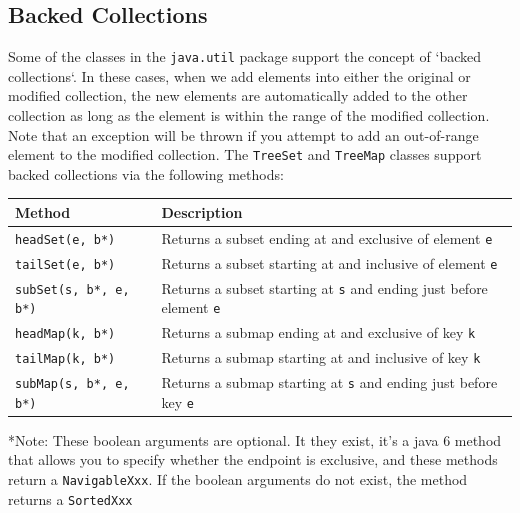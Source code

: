 \subsection{Backed Collections}
Some of the classes in the \verb#java.util# package support the concept of 
`backed collections`. In these cases, when we add elements into either the 
original or modified collection, the new elements are automatically added to 
the other collection as long as the element is within the range of the modified 
collection. Note that an exception will be thrown if you attempt to add an 
out-of-range element to the modified collection. The \verb#TreeSet# and 
\verb#TreeMap# classes support backed collections via the following methods:
\begin{center}
\begin{tabular}{ll}
    \textbf{Method} & \textbf{Description} \\
    \hline
    \verb#headSet(e, b*)# & Returns a subset ending at and exclusive of element 
    \verb#e# \\
    \verb#tailSet(e, b*)# & Returns a subset starting at and inclusive of 
    element \verb#e# \\
    \verb#subSet(s, b*, e, b*)# & Returns a subset starting at \verb#s# and 
    ending just before element \verb#e# \\
    \hline
    \verb#headMap(k, b*)# & Returns a submap ending at and exclusive of key 
    \verb#k# \\
    \verb#tailMap(k, b*)# & Returns a submap starting at and inclusive of key 
    \verb#k# \\
    \verb#subMap(s, b*, e, b*)# & Returns a submap starting at \verb#s# and 
    ending just before key \verb#e# \\
\end{tabular}
\end{center}
*Note: These boolean arguments are optional. It they exist, it's a java 6 
method that allows you to specify whether the endpoint is exclusive, and these 
methods return a \verb#NavigableXxx#. If the boolean arguments do not exist, 
the method returns a \verb#SortedXxx#


